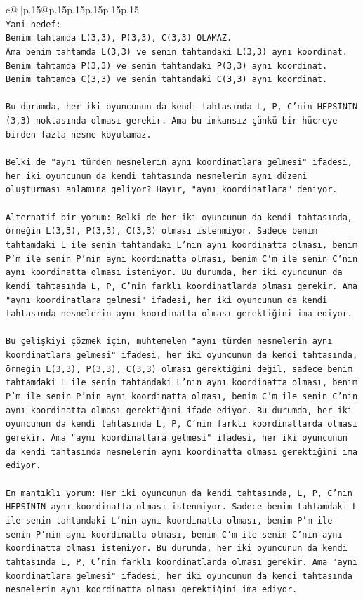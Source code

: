 \documentclass{article}
\begin{document}
{\begin{supertabular}{c@{$\;$}|p{.15\linewidth}@{}p{.15\linewidth}p{.15\linewidth}p{.15\linewidth}p{.15\linewidth}p{.15\linewidth}}
{{{\\ 
\texttt{Yani hedef:} \\
\texttt{Benim tahtamda L(3,3), P(3,3), C(3,3) OLAMAZ.} \\
\texttt{Ama benim tahtamda L(3,3) ve senin tahtandaki L(3,3) aynı koordinat.} \\
\texttt{Benim tahtamda P(3,3) ve senin tahtandaki P(3,3) aynı koordinat.} \\
\texttt{Benim tahtamda C(3,3) ve senin tahtandaki C(3,3) aynı koordinat.} \\
\\ 
\texttt{Bu durumda, her iki oyuncunun da kendi tahtasında L, P, C'nin HEPSİNİN (3,3) noktasında olması gerekir. Ama bu imkansız çünkü bir hücreye birden fazla nesne koyulamaz.} \\
\\ 
\texttt{Belki de "aynı türden nesnelerin aynı koordinatlara gelmesi" ifadesi, her iki oyuncunun da kendi tahtasında nesnelerin aynı düzeni oluşturması anlamına geliyor? Hayır, "aynı koordinatlara" deniyor.} \\
\\ 
\texttt{Alternatif bir yorum: Belki de her iki oyuncunun da kendi tahtasında, örneğin L(3,3), P(3,3), C(3,3) olması istenmiyor. Sadece benim tahtamdaki L ile senin tahtandaki L'nin aynı koordinatta olması, benim P'm ile senin P'nin aynı koordinatta olması, benim C'm ile senin C'nin aynı koordinatta olması isteniyor. Bu durumda, her iki oyuncunun da kendi tahtasında L, P, C'nin farklı koordinatlarda olması gerekir. Ama "aynı koordinatlara gelmesi" ifadesi, her iki oyuncunun da kendi tahtasında nesnelerin aynı koordinatta olması gerektiğini ima ediyor.} \\
\\ 
\texttt{Bu çelişkiyi çözmek için, muhtemelen "aynı türden nesnelerin aynı koordinatlara gelmesi" ifadesi, her iki oyuncunun da kendi tahtasında, örneğin L(3,3), P(3,3), C(3,3) olması gerektiğini değil, sadece benim tahtamdaki L ile senin tahtandaki L'nin aynı koordinatta olması, benim P'm ile senin P'nin aynı koordinatta olması, benim C'm ile senin C'nin aynı koordinatta olması gerektiğini ifade ediyor. Bu durumda, her iki oyuncunun da kendi tahtasında L, P, C'nin farklı koordinatlarda olması gerekir. Ama "aynı koordinatlara gelmesi" ifadesi, her iki oyuncunun da kendi tahtasında nesnelerin aynı koordinatta olması gerektiğini ima ediyor.} \\
\\ 
\texttt{En mantıklı yorum: Her iki oyuncunun da kendi tahtasında, L, P, C'nin HEPSİNİN aynı koordinatta olması istenmiyor. Sadece benim tahtamdaki L ile senin tahtandaki L'nin aynı koordinatta olması, benim P'm ile senin P'nin aynı koordinatta olması, benim C'm ile senin C'nin aynı koordinatta olması isteniyor. Bu durumda, her iki oyuncunun da kendi tahtasında L, P, C'nin farklı koordinatlarda olması gerekir. Ama "aynı koordinatlara gelmesi" ifadesi, her iki oyuncunun da kendi tahtasında nesnelerin aynı koordinatta olması gerektiğini ima ediyor.} \\
}}}
\end{supertabular}}
\end{document}
